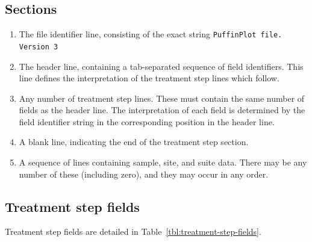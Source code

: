 \documentclass[a4paper,british]{article}
\begin{document}
\subsection{Sections}

\begin{enumerate}

\item The file identifier line, consisting of the exact string
  \verb|PuffinPlot file. Version 3|
\item The header line, containing a tab-separated sequence of field identifiers.
  This line defines the interpretation of the treatment step lines which
  follow.
\item Any number of treatment step lines. These must contain the same number
  of fields as the header line. The interpretation of each field is
  determined by the field identifier string in the corresponding position
  in the header line.
\item A blank line, indicating the end of the treatment step section.
\item A sequence of lines containing sample, site, and suite data. There may
  be any number of these (including zero), and they may occur in any
  order.

\end{enumerate}

\subsection{Treatment step fields}

Treatment step fields are detailed in Table~\ref{tbl:treatment-step-fields}.
\end{document}
